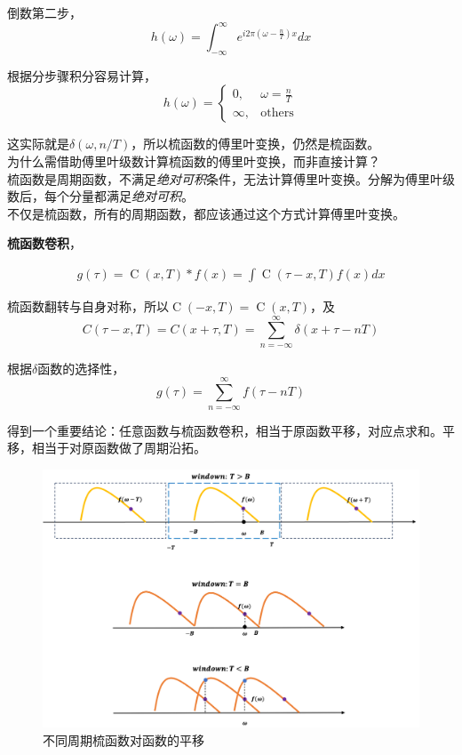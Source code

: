 		倒数第二步，
		$$
			h(\omega) = \int_{-\infty}^{\infty} e^{i2\pi(\omega - \frac{n}{T}) x}dx
		$$

		根据分步骤积分容易计算，
		$$
			h(\omega) =
			\begin{cases}
				0, & \omega = \frac{n}{T}\\
				\infty, & \text{others}
			\end{cases}
		$$

		这实际就是$\delta(\omega,n/T)$，所以梳函数的傅里叶变换，仍然是梳函数。\\

		为什么需借助傅里叶级数计算梳函数的傅里叶变换，而非直接计算？\\

		梳函数是周期函数，不满足\textit{绝对可积}条件，无法计算傅里叶变换。分解为傅里叶级数后，每个分量都满足\textit{绝对可积}。\\

		不仅是梳函数，所有的周期函数，都应该通过这个方式计算傅里叶变换。

		\textbf{梳函数卷积}，

		\begin{align*}
			g(\tau) = \mathop{C}(x,T) * f(x) = \int \mathop{C}(\tau-x,T)f(x)dx
		\end{align*}

		梳函数翻转与自身对称，所以$\mathop{C}(-x,T) = \mathop{C}(x,T)$，及
		$$
			C(\tau-x,T) = C(x+\tau,T) = \sum_{n=-\infty}^{\infty}\delta(x + \tau - nT)
		$$

		根据$\delta$函数的选择性，
		$$
			g(\tau) = \sum_{n=-\infty}^{\infty}f(\tau - nT)
		$$

		得到一个重要结论：任意函数与梳函数卷积，相当于原函数平移，对应点求和。平移，相当于对原函数做了周期沿拓。
		\begin{figure}[H]\label{comb_replica}
			\begin{center}
				\includegraphics[width=\textwidth]{./images/comb_shift.png}
			\end{center}
			\caption{不同周期梳函数对函数的平移}
		\end{figure}

